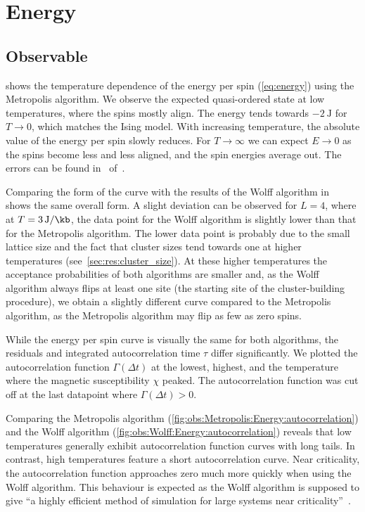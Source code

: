 \section{Energy}\label{sec:res:energy}
	\subsection{Observable}\label{sec:res:energy:observable}
		 shows the temperature dependence of the energy per spin (\cref{eq:energy}) using the Metropolis algorithm. We observe the expected quasi-ordered state at low temperatures, where the spins mostly align. The energy tends towards $\SI{-2}{\joule}$ for $T\rightarrow 0$, which matches the Ising model. With increasing temperature, the absolute value of the energy per spin slowly reduces. For $T \rightarrow \infty$ we can expect $E \rightarrow 0$ as the spins become less and less aligned, and the spin energies average out. The errors can be found in~ of~.
		
		Comparing the form of the curve with the results of the Wolff algorithm in~ shows the same overall form. A slight deviation can be observed for $L = 4$, where at $T = \SI{3}{\joule\per\kb}$, the data point for the Wolff algorithm is slightly lower than that for the Metropolis algorithm. The lower data point is probably due to the small lattice size and the fact that cluster sizes tend towards one at higher temperatures (see~\cref{sec:res:cluster_size}). At these higher temperatures the acceptance probabilities of both algorithms are smaller and, as the Wolff algorithm always flips at least one site (the starting site of the cluster-building procedure), we obtain a slightly different curve compared to the Metropolis algorithm, as the Metropolis algorithm may flip as few as zero spins.
		
		While the energy per spin curve is visually the same for both algorithms, the residuals and integrated autocorrelation time $\tau$ differ significantly. We plotted the autocorrelation function $\Gamma(\Delta t)$ at the lowest, highest, and the temperature where  the magnetic susceptibility $\chi$ peaked. The autocorrelation function was cut off at the last datapoint where $\Gamma(\Delta t) > \num{0}$.
		
		Comparing the Metropolis algorithm (\cref{fig:obs:Metropolis:Energy:autocorrelation}) and the Wolff algorithm (\cref{fig:obs:Wolff:Energy:autocorrelation}) reveals that low temperatures generally exhibit autocorrelation function curves with long tails. In contrast, high temperatures feature a short autocorrelation curve. Near criticality, the autocorrelation function approaches zero much more quickly when using the Wolff algorithm. This behaviour is expected as the Wolff algorithm is supposed to give \enquote{a highly efficient method of simulation for large systems near criticality}~\cite[p. 86]{sw}.
		
